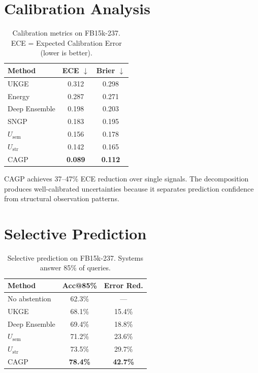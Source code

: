 \documentclass[accepted]{uai2024}  %
\begin{document}
\section{Calibration Analysis}
\label{app:calibration}

\begin{table}[h]
\centering
\caption{Calibration metrics on FB15k-237. ECE = Expected Calibration Error (lower is better).}
\begin{tabular}{lcc}
\toprule
Method & ECE $\downarrow$ & Brier $\downarrow$ \\
\midrule
UKGE & 0.312 & 0.298 \\
Energy & 0.287 & 0.271 \\
Deep Ensemble & 0.198 & 0.203 \\
SNGP & 0.183 & 0.195 \\
$U_{\text{sem}}$ & 0.156 & 0.178 \\
$U_{\text{str}}$ & 0.142 & 0.165 \\
CAGP & \textbf{0.089} & \textbf{0.112} \\
\bottomrule
\end{tabular}
\end{table}

CAGP achieves 37--47\% ECE reduction over single signals. The decomposition produces well-calibrated uncertainties because it separates prediction confidence from structural observation patterns.

\section{Selective Prediction}
\label{app:selective}

\begin{table}[h]
\centering
\caption{Selective prediction on FB15k-237. Systems answer 85\% of queries.}
\begin{tabular}{lcc}
\toprule
Method & Acc@85\% & Error Red. \\
\midrule
No abstention & 62.3\% & --- \\
UKGE & 68.1\% & 15.4\% \\
Deep Ensemble & 69.4\% & 18.8\% \\
$U_{\text{sem}}$ & 71.2\% & 23.6\% \\
$U_{\text{str}}$ & 73.5\% & 29.7\% \\
CAGP & \textbf{78.4\%} & \textbf{42.7\%} \\
\bottomrule
\end{tabular}
\end{table}
\end{document}
